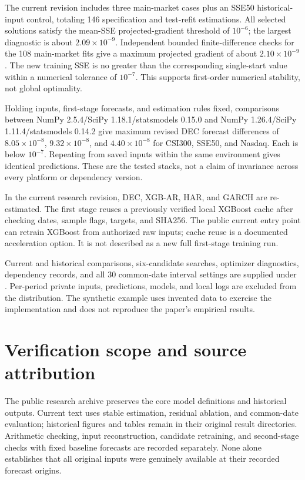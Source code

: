 The current revision includes three main-market cases plus an SSE50 historical-input control, totaling 146 specification and test-refit estimations. All selected solutions satisfy the mean-SSE projected-gradient threshold of $10^{-6}$; the largest diagnostic is about $2.09\times10^{-9}$. Independent bounded finite-difference checks for the 108 main-market fits give a maximum projected gradient of about $2.10\times10^{-9}$. The new training SSE is no greater than the corresponding single-start value within a numerical tolerance of $10^{-7}$. This supports first-order numerical stability, not global optimality.

Holding inputs, first-stage forecasts, and estimation rules fixed, comparisons between NumPy 2.5.4/SciPy 1.18.1/statsmodels 0.15.0 and NumPy 1.26.4/SciPy 1.11.4/statsmodels 0.14.2 give maximum revised DEC forecast differences of $8.05\times10^{-8}$, $9.32\times10^{-8}$, and $4.40\times10^{-8}$ for CSI300, SSE50, and Nasdaq. Each is below $10^{-7}$. Repeating from saved inputs within the same environment gives identical predictions. These are the tested stacks, not a claim of invariance across every platform or dependency version.

In the current research revision, DEC, XGB-AR, HAR, and GARCH are re-estimated. The first stage reuses a previously verified local XGBoost cache after checking dates, sample flags, targets, and SHA256. The public current entry point can retrain XGBoost from authorized raw inputs; cache reuse is a documented acceleration option. It is not described as a new full first-stage training run.

Current and historical comparisons, six-candidate searches, optimizer diagnostics, dependency records, and all 30 common-date interval settings are supplied under . Per-period private inputs, predictions, models, and local logs are excluded from the distribution. The synthetic example uses invented data to exercise the implementation and does not reproduce the paper's empirical results.

\section{Verification scope and source attribution}
The public research archive preserves the core model definitions and historical outputs. Current text uses stable estimation, residual ablation, and common-date evaluation; historical figures and tables remain in their original result directories. Arithmetic checking, input reconstruction, candidate retraining, and second-stage checks with fixed baseline forecasts are recorded separately. None alone establishes that all original inputs were genuinely available at their recorded forecast origins.

